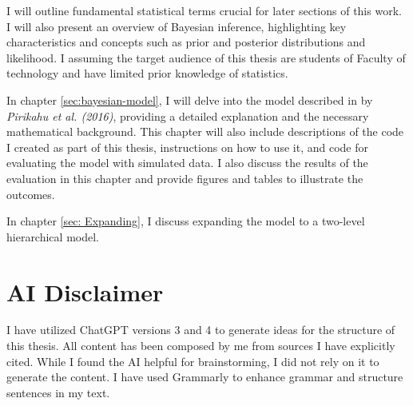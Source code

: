 I will outline fundamental statistical terms crucial for later sections of this work. I will also present an overview of Bayesian inference, highlighting key characteristics and concepts such as prior and posterior distributions and likelihood. I assuming the target audience of this thesis are students of Faculty of technology and have limited prior knowledge of statistics.

In chapter \ref{sec:bayesian-model}, I will delve into the model described in by \textit{Pirikahu et al. (2016)}, providing a detailed explanation and the necessary mathematical background. This chapter will also include descriptions of the code I created as part of this thesis, instructions on how to use it, and code for evaluating the model with simulated data. I also discuss the results of the evaluation in this chapter and provide figures and tables to illustrate the outcomes.

In chapter \ref{sec: Expanding}, I discuss expanding the model to a two-level hierarchical model. 

\section{AI Disclaimer} \label{sec:AI}
I have utilized ChatGPT versions 3 and 4 to generate ideas for the structure of this thesis. All content has been composed by me from sources I have explicitly cited. While I found the AI helpful for brainstorming, I did not rely on it to generate the content. I have used Grammarly to enhance grammar and structure sentences in my text.
